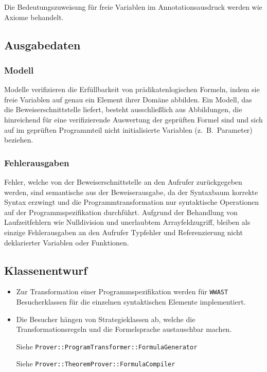 Die Bedeutungszuweisung für freie Variablen im Annotationsausdruck werden wie
Axiome behandelt.%

\subsection{Ausgabedaten}%

\subsubsection{Modell}%

Modelle verifizieren die Erfüllbarkeit von prädikatenlogischen
Formeln, indem sie freie Variablen auf genau ein Element ihrer Domäne
abbilden. Ein Modell, das die Beweiserschnittstelle liefert, besteht
ausschließlich aus Abbildungen, die hinreichend für eine
verifizierende Auswertung der geprüften Formel sind und sich auf im
geprüften Programmteil nicht initialisierte Variablen (z.~B.\
Parameter) beziehen.%

\subsubsection{Fehlerausgaben}%

Fehler, welche von der Beweiserschnittstelle an den Aufrufer
zurückgegeben werden, sind semantische aus der Beweiserausgabe, da der
Syntaxbaum korrekte Syntax erzwingt und die Programmtransformation nur
syntaktische Operationen auf der Programmspezifikation durchführt.
Aufgrund der Behandlung von Laufzeitfehlern wie Nulldivision und
unerlaubtem Arrayfeldzugriff, bleiben als einzige Fehlerausgaben an
den Aufrufer Typfehler und Referenzierung nicht deklarierter Variablen
oder Funktionen.%

\subsection{Klassenentwurf}%

\begin{itemize}%

    \item Zur Transformation einer Programmspezifikation werden für
    \texttt{WWAST} Besucherklassen für die einzelnen syntaktischen
    Elemente implementiert.%

    \item Die Besucher hängen von Strategieklassen ab, welche die
    Transformationsregeln und die Formelsprache austauschbar machen.%

    Siehe \texttt{Prover::ProgramTransformer::FormulaGenerator}%

    Siehe \texttt{Prover::TheoremProver::FormulaCompiler}%


\end{itemize}%

